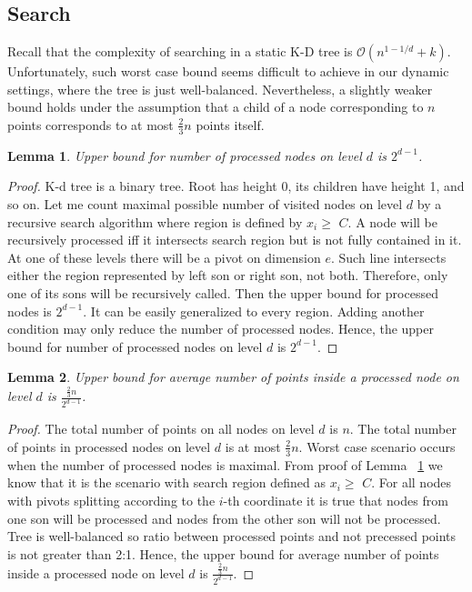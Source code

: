 \documentclass[10pt,a4paper]{article}
\newtheorem{lemma}{Lemma}
\newcommand{\Oh}{\mathcal{O}}
\begin{document}
\subsection{Search}

Recall that the complexity of searching in a static K-D tree is $\Oh(n^{1-1/d} + k)$. Unfortunately, such worst case bound seems difficult to achieve in our dynamic settings, where the tree is just well-balanced. Nevertheless, a slightly weaker bound holds under the assumption that a child of a node corresponding to $n$ points corresponds to at most $\frac{2}{3}n$ points itself.

\begin{lemma}\label{lem:3}
Upper bound for number of processed nodes on level $d$ is $2^{d-1}$.
\end{lemma}

\begin{proof}

K-d tree is a binary tree. Root has height 0, its children have height 1, and so on. Let me count maximal possible number of visited nodes on level $d$ by a recursive search algorithm where region is defined by $x_i \geq$ $C$. A node will be recursively processed iff it intersects search region but is not fully contained in it. At one of these levels there will be a pivot on dimension $e$. Such line intersects either the region represented by left son or right son, not both. Therefore, only one of its sons will be recursively called. Then the upper bound for processed nodes is $2^{d-1}$. It can be easily generalized to every region. Adding another condition may only reduce the number of processed nodes. Hence, the upper bound for number of processed nodes on level $d$ is $2^{d-1}$. 
\end{proof}


\begin{lemma}\label{lem:4}
Upper bound for average number of points inside a processed node on level $d$ is $\frac{\frac{2}{3}n}{2^{d-1}}$.
\end{lemma}

\begin{proof}

The total number of points on all nodes on level $d$ is $n$. The total number of points in processed nodes on level $d$ is at most $\frac{2}{3}n$. Worst case scenario occurs when the number of processed nodes is maximal. From proof of Lemma ~\ref{lem:3} we know that it is the scenario with search region defined as $x_i \geq$ $C$. For all nodes with pivots splitting according to the $i$-th coordinate it is true that nodes from one son will be processed and nodes from the other son will not be processed. Tree is well-balanced so ratio between processed points and not precessed points is not greater than 2:1. Hence, the upper bound for average number of points inside a processed node on level $d$ is $\frac{\frac{2}{3}n}{2^{d-1}}$.
\end{proof}
\end{document}

